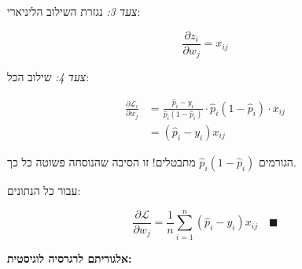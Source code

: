 \textit{צעד 3:} נגזרת השילוב הליניארי:

\begin{equation}
\frac{\partial z_i}{\partial w_j} = x_{ij}
\end{equation}

\textit{צעד 4:} שילוב הכל:

\begin{align}
\frac{\partial \mathcal{L}_i}{\partial w_j} &= \frac{\hat{p}_i - y_i}{\hat{p}_i(1-\hat{p}_i)} \cdot \hat{p}_i(1-\hat{p}_i) \cdot x_{ij} \nonumber \\
&= (\hat{p}_i - y_i) x_{ij}
\end{align}

הגורמים $\hat{p}_i(1-\hat{p}_i)$ מתבטלים! זו הסיבה שהנוסחה פשוטה כל כך.

עבור כל הנתונים:

\begin{equation}
\frac{\partial \mathcal{L}}{\partial w_j} = \frac{1}{n}\sum_{i=1}^{n}(\hat{p}_i - y_i)x_{ij} \quad \blacksquare
\end{equation}

\textbf{אלגוריתם  לרגרסיה לוגיסטית:}

